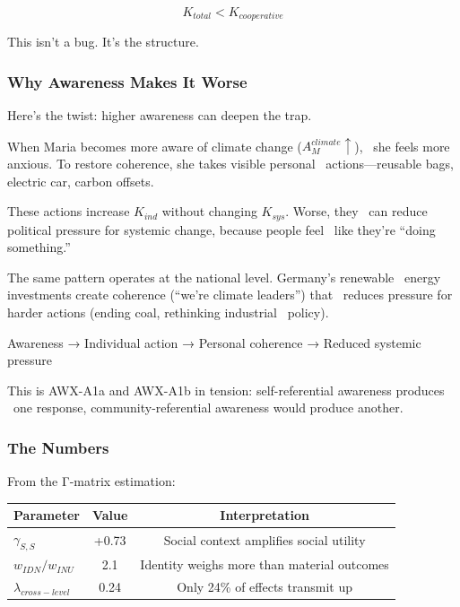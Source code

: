 \begin{equation}
K_{total} < K_{cooperative}
\end{equation}

This isn't a bug. It's the structure.

\subsubsection{Why Awareness Makes It Worse}

Here's the twist: higher awareness can deepen the trap.

When Maria becomes more aware of climate change ($A_M^{climate} \uparrow$), \
she feels more anxious. To restore coherence, she takes visible personal \
actions---reusable bags, electric car, carbon offsets.

These actions increase $K_{ind}$ without changing $K_{sys}$. Worse, they \
can reduce political pressure for systemic change, because people feel \
like they're ``doing something.''

The same pattern operates at the national level. Germany's renewable \
energy investments create coherence (``we're climate leaders'') that \
reduces pressure for harder actions (ending coal, rethinking industrial \
policy).

Awareness → Individual action → Personal coherence → Reduced systemic pressure

This is AWX-A1a and AWX-A1b in tension: self-referential awareness produces \
one response, community-referential awareness would produce another.

\subsubsection{The Numbers}

From the Γ-matrix estimation:

\begin{center}
\renewcommand{\arraystretch}{1.3}
\begin{tabular}{lcc}
\hline
\textbf{Parameter} & \textbf{Value} & \textbf{Interpretation} \\
\hline
$\gamma_{S,S}$ & +0.73 & Social context amplifies social utility \\
$w_{IDN}/w_{INU}$ & 2.1 & Identity weighs more than material outcomes \\
$\lambda_{cross-level}$ & 0.24 & Only 24\% of effects transmit up \\
\hline
\end{tabular}
\end{center}

